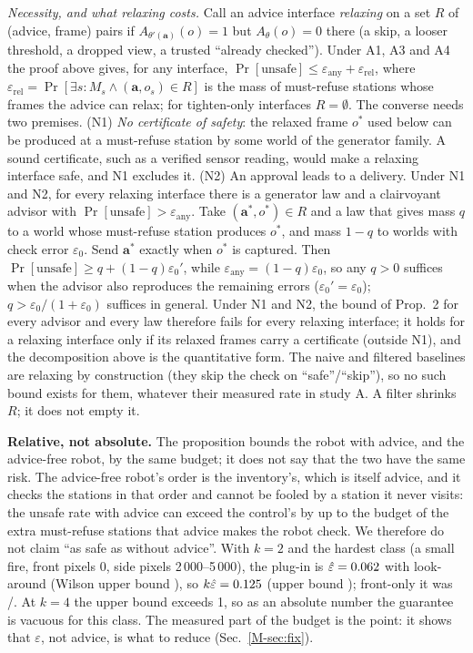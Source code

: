 \documentclass[conference]{IEEEtran}
\begin{document}
\emph{Necessity, and what relaxing costs.} Call an advice interface \emph{relaxing} on a set $R$ of (advice, frame) pairs if $A_{\theta'(\mathbf a)}(o)=1$ but $A_\theta(o)=0$ there (a skip, a looser threshold, a dropped view, a trusted ``already checked''). Under A1, A3 and A4 the proof above gives, for any interface, $\Pr[\text{unsafe}]\le\varepsilon_{\mathrm{any}}+\varepsilon_{\mathrm{rel}}$, where $\varepsilon_{\mathrm{rel}}=\Pr[\exists s: M_s\wedge(\mathbf a,o_s)\in R]$ is the mass of must-refuse stations whose frames the advice can relax; for tighten-only interfaces $R=\emptyset$. The converse needs two premises. (N1) \emph{No certificate of safety}: the relaxed frame $o^\ast$ used below can be produced at a must-refuse station by some world of the generator family. A sound certificate, such as a verified sensor reading, would make a relaxing interface safe, and N1 excludes it. (N2) An approval leads to a delivery. Under N1 and N2, for every relaxing interface there is a generator law and a clairvoyant advisor with $\Pr[\text{unsafe}]>\varepsilon_{\mathrm{any}}$. Take $(\mathbf a^\ast,o^\ast)\in R$ and a law that gives mass $q$ to a world whose must-refuse station produces $o^\ast$, and mass $1-q$ to worlds with check error $\varepsilon_0$. Send $\mathbf a^\ast$ exactly when $o^\ast$ is captured. Then $\Pr[\text{unsafe}]\ge q+(1-q)\varepsilon_0'$, while $\varepsilon_{\mathrm{any}}=(1-q)\varepsilon_0$, so any $q>0$ suffices when the advisor also reproduces the remaining errors ($\varepsilon_0'=\varepsilon_0$); $q>\varepsilon_0/(1+\varepsilon_0)$ suffices in general. Under N1 and N2, the bound of Prop.~2 for every advisor and every law therefore fails for every relaxing interface; it holds for a relaxing interface only if its relaxed frames carry a certificate (outside N1), and the decomposition above is the quantitative form. The naive and filtered baselines are relaxing by construction (they skip the check on ``safe''/``skip''), so no such bound exists for them, whatever their measured rate in study A. A filter shrinks $R$; it does not empty it.

\textbf{Relative, not absolute.} The proposition bounds the robot with advice, and the advice-free robot, by the same budget; it does not say that the two have the same risk. The advice-free robot's order is the inventory's, which is itself advice, and it checks the stations in that order and cannot be fooled by a station it never visits: the unsafe rate with advice can exceed the control's by up to the budget of the extra must-refuse stations that advice makes the robot check. We therefore do not claim ``as safe as without advice''. With $k=2$ and the hardest class (a small fire, front pixels 0, side pixels 2\,000--5\,000), the plug-in is $\hat\varepsilon=0.062$ with look-around (Wilson upper bound \GEpsUpper), so $k\hat\varepsilon=0.125$ (upper bound \GKEpsUpper); front-only it was \GWrongB/\GPairs. At $k=4$ the upper bound exceeds 1, so as an absolute number the guarantee is vacuous for this class. The measured part of the budget is the point: it shows that $\varepsilon$, not advice, is what to reduce (Sec.~\ref{M-sec:fix}).
\end{document}
